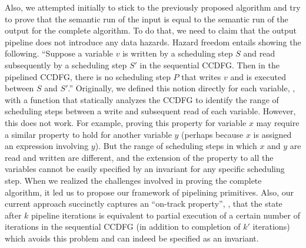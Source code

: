 Also, we attempted initially to stick to the previously proposed algorithm
and try to prove that the semantic run of the input is equal to the semantic run
of the output for the complete algorithm. To do that, we need to claim that
the output pipeline does not introduce any data hazards.
Hazard freedom entails showing the
following. ``Suppose a variable $v$ is written by a
scheduling step $S$ and read subsequently by a scheduling
step $S'$ in the sequential CCDFG.  Then in the pipelined
CCDFG, there is no scheduling step $P$ that writes $v$ and
is executed between $S$ and $S'$.''  Originally, we defined
this notion directly for each variable, \viz, with a
function that statically analyzes the CCDFG to identify the
range of scheduling steps between a write and subsequent
read of each variable.  However, this does not
work.  For example, proving this property for variable $x$
may require a similar property to hold for another variable
$y$ (perhaps because $x$ is assigned an expression involving
$y$).  But the range of scheduling steps in which $x$ and
$y$ are read and written are different, and the extension of
the property to all the variables cannot be easily specified
by an invariant for any specific scheduling step. When we realized
the challenges involved in proving the complete algorithm,
it led us to propose our framework of pipelining primitives.
Also, our current approach succinctly captures an ``on-track property'',
\viz, that the
state after $k$ pipeline iterations is equivalent to partial
execution of a certain number of iterations in the
sequential CCDFG (in addition to completion of $k'$
iterations) which avoids this problem and can indeed be
specified as an invariant.


